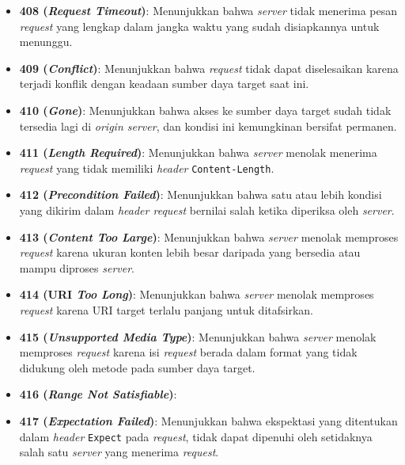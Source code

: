 \begin{itemize}
    \item \textbf{408 (\textit{Request Timeout})}: Menunjukkan bahwa \textit{server} tidak menerima pesan \textit{request} yang lengkap dalam jangka waktu yang sudah disiapkannya untuk menunggu.
  
    \item \textbf{409 (\textit{Conflict})}: Menunjukkan bahwa \textit{request} tidak dapat diselesaikan karena terjadi konflik dengan keadaan sumber daya target saat ini.
  
    \item \textbf{410 (\textit{Gone})}: Menunjukkan bahwa akses ke sumber daya target sudah tidak tersedia lagi di \textit{origin server}, dan kondisi ini kemungkinan bersifat permanen.
  
    \item \textbf{411 (\textit{Length Required})}: Menunjukkan bahwa \textit{server} menolak menerima \textit{request} yang tidak memiliki \textit{header} \texttt{Content-Length}.
  
    \item \textbf{412 (\textit{Precondition Failed})}: Menunjukkan bahwa satu atau lebih kondisi yang dikirim dalam \textit{header request} bernilai salah ketika diperiksa oleh \textit{server}.
  
    \item \textbf{413 (\textit{Content Too Large})}: Menunjukkan bahwa \textit{server} menolak memproses \textit{request} karena ukuran konten lebih besar daripada yang bersedia atau mampu diproses \textit{server}.
  
    \item \textbf{414 (URI \textit{Too Long})}: Menunjukkan bahwa \textit{server} menolak memproses \textit{request} karena URI target terlalu panjang untuk ditafsirkan.
  
    \item \textbf{415 (\textit{Unsupported Media Type})}: Menunjukkan bahwa \textit{server} menolak memproses \textit{request} karena isi \textit{request} berada dalam format yang tidak didukung oleh metode pada sumber daya target.
  
    \item \textbf{416 (\textit{Range Not Satisfiable})}: 
  
    \item \textbf{417 (\textit{Expectation Failed})}: Menunjukkan bahwa ekspektasi yang ditentukan dalam \textit{header} \texttt{Expect} pada \textit{request}, tidak dapat dipenuhi oleh setidaknya salah satu \textit{server} yang menerima \textit{request}.
  

\end{itemize}
